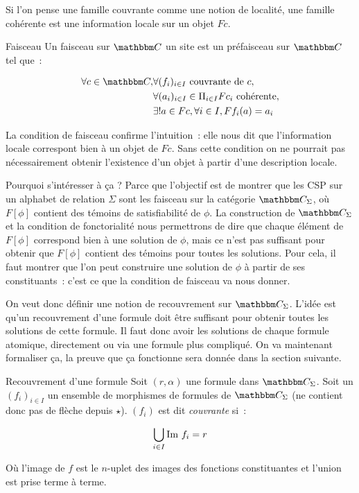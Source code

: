 Si l'on pense une famille couvrante comme une notion de localité, une famille cohérente
est une information locale sur un objet $Fc$.

\begin{defi}{Faisceau}
    Un faisceau sur $\C$ un site est un préfaisceau sur $\C$ tel que~:

    \begin{align*}
        \forall c\in\C, & \forall (f_i)_{i\in I}\text{ couvrante de } c, \\
                        & \forall (a_i)_{i\in I}\in\Pi_{i\in I}Fc_i \text{ cohérente}, \\
                        & \exists ! a\in Fc, \forall i\in I, Ff_i(a) = a_i
    \end{align*}
\end{defi}

La condition de faisceau confirme l'intuition~: elle nous dit que l'information locale
correspont bien à un objet de $Fc$. Sans cette condition on ne pourrait pas nécessairement
obtenir l'existence d'un objet à partir d'une description locale.

Pourquoi s'intéresser à ça ? Parce que l'objectif est de montrer que les CSP
sur un alphabet de relation $\Sigma$ sont les faisceau sur la catégorie
$\C_\Sigma$, où $F[\phi]$ contient des témoins de satisfiabilité de $\phi$. La
construction de $\C_\Sigma$ et la condition de fonctorialité nous permettrons
de dire que chaque élément de $F[\phi]$ correspond bien à une solution de
$\phi$, mais ce n'est pas suffisant pour obtenir que $F[\phi]$ contient des
témoins pour toutes les solutions. Pour cela, il faut montrer que l'on peut
construire une solution de $\phi$ à partir de ses constituants~: c'est ce que
la condition de faisceau va nous donner.

On veut donc définir une notion de recouvrement sur $\C_\Sigma$. L'idée est
qu'un recouvrement d'une formule doit être suffisant pour obtenir toutes les
solutions de cette formule. Il faut donc avoir les solutions de chaque formule
atomique, directement ou via une formule plus compliqué. On va maintenant
formaliser ça, la preuve que ça fonctionne sera donnée dans la section
suivante.

\begin{defi}{Recouvrement d'une formule}
    Soit $(r,\alpha)$ une formule dans $\C_\Sigma$. Soit un $(f_i)_{i\in I}$ un ensemble
    de morphismes de formules de $\C_\Sigma$ (ne contient donc pas de flèche depuis
    $\star$). $(f_i)$ est dit \emph{couvrante} si~:

    \[ \bigcup_{i\in I} \text{Im } f_i = r \]

    Où l'image de $f$ est le $n$-uplet des images des fonctions constituantes et
    l'union est prise terme à terme.
\end{defi}

